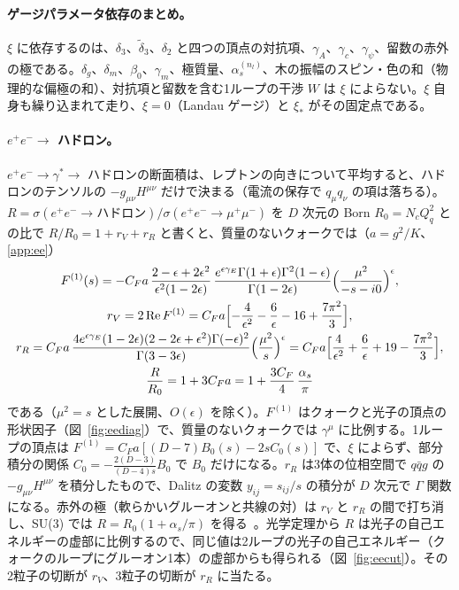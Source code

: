 \documentclass[a4paper,10pt]{ltjsarticle}
\begin{document}
\paragraph{ゲージパラメータ依存のまとめ。}$\xi$ に依存するのは、$\delta_3$、$\tilde\delta_3$、$\delta_2$ と四つの頂点の対抗項、$\gamma_A$、$\gamma_c$、$\gamma_\psi$、留数の赤外の極である。$\delta_g$、$\delta_m$、$\beta_0$、$\gamma_m$、極質量、$\alpha_s^{(n_l)}$、木の振幅のスピン・色の和（物理的な偏極の和）、対抗項と留数を含む1ループの干渉 $W$ は $\xi$ によらない。$\xi$ 自身も繰り込まれて走り、$\xi=0$（Landau ゲージ）と $\xi_*$ がその固定点である。

\paragraph{$e^+e^-\to$ ハドロン。}$e^+e^-\to\gamma^*\to$ ハドロンの断面積は、レプトンの向きについて平均すると、ハドロンのテンソルの $-g_{\mu\nu}H^{\mu\nu}$ だけで決まる（電流の保存で $q_\mu q_\nu$ の項は落ちる）。$R=\sigma(e^+e^-\to\text{ハドロン})/\sigma(e^+e^-\to\mu^+\mu^-)$ を $D$ 次元の Born $R_0=N_cQ_q^2$ との比で $R/R_0=1+r_V+r_R$ と書くと、質量のないクォークでは（$a=g^2/K$、\ref{app:ee}）
\begin{equation}
\begin{gathered}
F^{(1)}(s)=-C_Fa\,\frac{2-\epsilon+2\epsilon^2}{\epsilon^2(1-2\epsilon)}\,\frac{e^{\epsilon\gamma_E}\Gamma(1+\epsilon)\Gamma^2(1-\epsilon)}{\Gamma(1-2\epsilon)}\Bigl(\frac{\mu^2}{-s-i0}\Bigr)^{\epsilon},\\
r_V=2\,\mathrm{Re}\,F^{(1)}=C_Fa\Bigl[-\frac4{\epsilon^2}-\frac6\epsilon-16+\frac{7\pi^2}3\Bigr],\\
r_R=C_Fa\,\frac{4e^{\epsilon\gamma_E}(1-2\epsilon)(2-2\epsilon+\epsilon^2)\Gamma(-\epsilon)^2}{\Gamma(3-3\epsilon)}\Bigl(\frac{\mu^2}{s}\Bigr)^{\epsilon}=C_Fa\Bigl[\frac4{\epsilon^2}+\frac6\epsilon+19-\frac{7\pi^2}3\Bigr],\\
\frac R{R_0}=1+3C_Fa=1+\frac{3C_F}4\,\frac{\alpha_s}\pi
\end{gathered}
\label{eq:rr}
\end{equation}
である（$\mu^2=s$ とした展開、$O(\epsilon)$ を除く）。$F^{(1)}$ はクォークと光子の頂点の形状因子（図~\ref{fig:eediag}）で、質量のないクォークでは $\gamma^\mu$ に比例する。1ループの頂点は $F^{(1)}=C_Fa[(D-7)B_0(s)-2sC_0(s)]$ で、$\xi$ によらず、部分積分の関係 $C_0=-\frac{2(D-3)}{(D-4)s}B_0$ で $B_0$ だけになる。$r_R$ は3体の位相空間で $q\bar qg$ の $-g_{\mu\nu}H^{\mu\nu}$ を積分したもので、Dalitz の変数 $y_{ij}=s_{ij}/s$ の積分が $D$ 次元で $\Gamma$ 関数になる。赤外の極（軟らかいグルーオンと共線の対）は $r_V$ と $r_R$ の間で打ち消し、SU(3) では $R=R_0(1+\alpha_s/\pi)$ を得る~\cite{ds79,ckt79,cg80}。光学定理から $R$ は光子の自己エネルギーの虚部に比例するので、同じ値は2ループの光子の自己エネルギー（クォークのループにグルーオン1本）の虚部からも得られる（図~\ref{fig:eecut}）。その2粒子の切断が $r_V$、3粒子の切断が $r_R$ に当たる。
\end{document}

